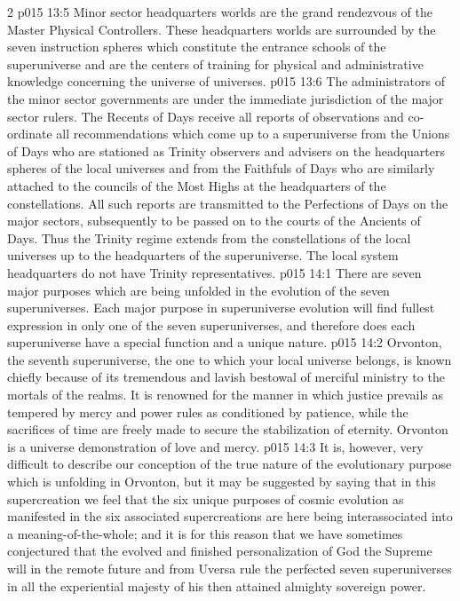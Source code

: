 \begin{multicols}{2}
\vs p015 13:5 Minor sector headquarters worlds are the grand rendezvous of the Master Physical Controllers. These headquarters worlds are surrounded by the seven instruction spheres which constitute the entrance schools of the superuniverse and are the centers of training for physical and administrative knowledge concerning the universe of universes.
\vs p015 13:6 The administrators of the minor sector governments are under the immediate jurisdiction of the major sector rulers. The Recents of Days receive all reports of observations and co\hyp{}ordinate all recommendations which come up to a superuniverse from the Unions of Days who are stationed as Trinity observers and advisers on the headquarters spheres of the local universes and from the Faithfuls of Days who are similarly attached to the councils of the Most Highs at the headquarters of the constellations. All such reports are transmitted to the Perfections of Days on the major sectors, subsequently to be passed on to the courts of the Ancients of Days. Thus the Trinity regime extends from the constellations of the local universes up to the headquarters of the superuniverse. The local system headquarters do not have Trinity representatives.
\vs p015 14:1 There are seven major purposes which are being unfolded in the evolution of the seven superuniverses. Each major purpose in superuniverse evolution will find fullest expression in only one of the seven superuniverses, and therefore does each superuniverse have a special function and a unique nature.
\vs p015 14:2 Orvonton, the seventh superuniverse, the one to which your local universe belongs, is known chiefly because of its tremendous and lavish bestowal of merciful ministry to the mortals of the realms. It is renowned for the manner in which justice prevails as tempered by mercy and power rules as conditioned by patience, while the sacrifices of time are freely made to secure the stabilization of eternity. Orvonton is a universe demonstration of love and mercy.
\vs p015 14:3 It is, however, very difficult to describe our conception of the true nature of the evolutionary purpose which is unfolding in Orvonton, but it may be suggested by saying that in this supercreation we feel that the six unique purposes of cosmic evolution as manifested in the six associated supercreations are here being interassociated into a meaning\hyp{}of\hyp{}the\hyp{}whole; and it is for this reason that we have sometimes conjectured that the evolved and finished personalization of God the Supreme will in the remote future and from Uversa rule the perfected seven superuniverses in all the experiential majesty of his then attained almighty sovereign power.

\end{multicols}

